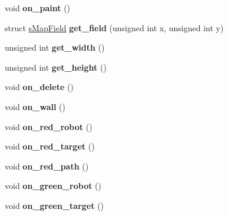 \begin{DoxyCompactItemize}
\item 
\hypertarget{classCAppCore_a5081d0908fdee65af5b3c54b19ccc993}{void {\bfseries on\-\_\-paint} ()}\label{classCAppCore_a5081d0908fdee65af5b3c54b19ccc993}

\item 
\hypertarget{classCAppCore_ad9a78b916c2920501a42e012bec8bf6f}{struct \hyperlink{structsMapField}{s\-Map\-Field} {\bfseries get\-\_\-field} (unsigned int x, unsigned int y)}\label{classCAppCore_ad9a78b916c2920501a42e012bec8bf6f}

\item 
\hypertarget{classCAppCore_abd50d06be6f9361f7e4560a8b73a88cb}{unsigned int {\bfseries get\-\_\-width} ()}\label{classCAppCore_abd50d06be6f9361f7e4560a8b73a88cb}

\item 
\hypertarget{classCAppCore_a5e21b617f5b3ad55cdca457c63549643}{unsigned int {\bfseries get\-\_\-height} ()}\label{classCAppCore_a5e21b617f5b3ad55cdca457c63549643}

\item 
\hypertarget{classCAppCore_a96423a3af586771a52f3c61b537a2853}{void {\bfseries on\-\_\-delete} ()}\label{classCAppCore_a96423a3af586771a52f3c61b537a2853}

\item 
\hypertarget{classCAppCore_acf04a5ce23252208bdb77c132e0880ab}{void {\bfseries on\-\_\-wall} ()}\label{classCAppCore_acf04a5ce23252208bdb77c132e0880ab}

\item 
\hypertarget{classCAppCore_aba6ac7e5d40f28361313eac033e36d4b}{void {\bfseries on\-\_\-red\-\_\-robot} ()}\label{classCAppCore_aba6ac7e5d40f28361313eac033e36d4b}

\item 
\hypertarget{classCAppCore_a801a321e87e5500ee9b28bde9afd9e88}{void {\bfseries on\-\_\-red\-\_\-target} ()}\label{classCAppCore_a801a321e87e5500ee9b28bde9afd9e88}

\item 
\hypertarget{classCAppCore_a36f4427de8f00fa4306fdf4840c41647}{void {\bfseries on\-\_\-red\-\_\-path} ()}\label{classCAppCore_a36f4427de8f00fa4306fdf4840c41647}

\item 
\hypertarget{classCAppCore_a7354799f2e276542afd6791a132ec044}{void {\bfseries on\-\_\-green\-\_\-robot} ()}\label{classCAppCore_a7354799f2e276542afd6791a132ec044}

\item 
\hypertarget{classCAppCore_a3c7e2bed79f742da3b18d43216a1b482}{void {\bfseries on\-\_\-green\-\_\-target} ()}\label{classCAppCore_a3c7e2bed79f742da3b18d43216a1b482}


\end{DoxyCompactItemize}
